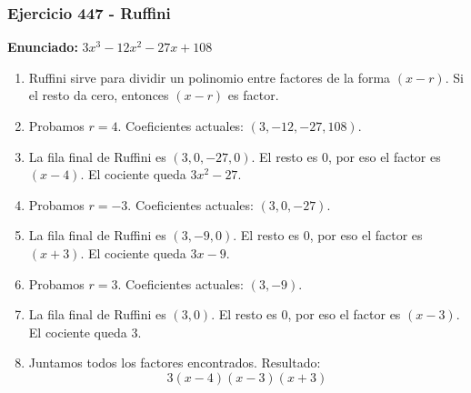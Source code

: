 \documentclass[11pt,a4paper]{article}
\begin{document}
\vspace{0.2cm}
\subsubsection*{Ejercicio 447 - Ruffini}
\textbf{Enunciado:} $ 3 x^{3} - 12 x^{2} - 27 x + 108 $\par
\begin{enumerate}[leftmargin=2em]
\item Ruffini sirve para dividir un polinomio entre factores de la forma \((x-r)\). Si el resto da cero, entonces \((x-r)\) es factor.
\item Probamos \(r=4\). Coeficientes actuales: \((3, -12, -27, 108)\).
\item La fila final de Ruffini es \((3, 0, -27, 0)\). El resto es \(0\), por eso el factor es \((x-4)\). El cociente queda \(3 x^{2} - 27\).
\item Probamos \(r=-3\). Coeficientes actuales: \((3, 0, -27)\).
\item La fila final de Ruffini es \((3, -9, 0)\). El resto es \(0\), por eso el factor es \((x+3)\). El cociente queda \(3 x - 9\).
\item Probamos \(r=3\). Coeficientes actuales: \((3, -9)\).
\item La fila final de Ruffini es \((3, 0)\). El resto es \(0\), por eso el factor es \((x-3)\). El cociente queda \(3\).
\item Juntamos todos los factores encontrados. Resultado: \[\boxed{3 \left(x - 4\right) \left(x - 3\right) \left(x + 3\right)}\]
\end{enumerate}

\vspace{0.2cm}
\end{document}

